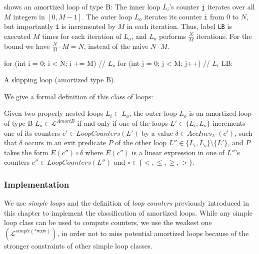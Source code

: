 \begin{example}
     shows an amortized loop of type B: The inner loop $L_i$'s counter \texttt{j} iterates over all $M$ integers in $[0, M-1]$. The outer loop $L_o$ iterates its counter \texttt{i} from 0 to $N$, but importantly \texttt{i} is incremented by $M$ in each iteration. Thus, label \texttt{LB} is executed $M$ times for each iteration of $L_o$, and $L_o$ performs $\frac{N}{M}$ iterations. For the bound we have $\frac{N}{M} \cdot M = N$, instead of the naive $N \cdot M$.
\end{example}

\begin{listing}
\begin{ccode}
for (int i = 0; i < N; i += M) {   // $L_o$
    for (int j = 0; j < M; j++) {  // $L_i$
LB:
    }
}
\end{ccode}
\caption{A skipping loop (amortized type B).}
\label{lst:amortb}
\end{listing}

We give a formal definition of this class of loops:

\begin{definition}
    Given two properly nested loops $L_i \subset L_o$, the outer loop $L_o$ is an amortized loop of type B $L_o \in \mathcal{L}^{AmortB}$ if and only if one of the loops $L' \in \{L_i, L_o\}$ increments one of its counters $c' \in LoopCounters(L')$ by a value $\delta \in AccIncs_{L'}(c')$, such that $\delta$ occurs in an exit predicate $P$ of the other loop $L'' \in \{L_i, L_o\}\setminus\{L'\}$, and $P$ takes the form $E(c'') \circ \delta$ where $E(c'')$ is a linear expression in one of $L''$'s counters $c'' \in LoopCounters(L'')$ and $\circ \in \{ <, \le, \ge, > \}$.
\end{definition}

\subsubsection{Implementation}

We use \emph{simple loops} and the definition of \emph{loop counters} previously introduced in this chapter to implement the classification of amortized loops. While any simple loop class can be used to compute counters, we use the weakest one $\left(\mathcal{L}^{simple(\text{*wxw})}\right)$, in order not to miss potential amortized loops because of the stronger constraints of other simple loop classes.

